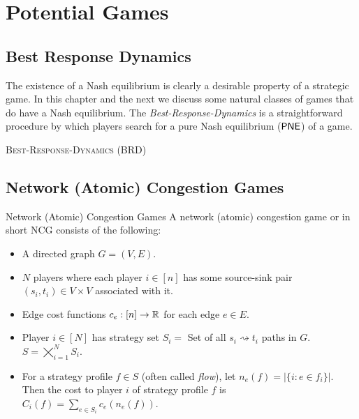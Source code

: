 \chapter{Potential Games}
\section{Best Response Dynamics}
The existence of a Nash equilibrium is clearly a desirable property of a strategic game. In this chapter and the next we discuss some natural classes of games that do have a Nash equilibrium. The \textit{Best-Response-Dynamics} is a straightforward procedure by which players search for a pure
Nash equilibrium ($\operatorname{\mathsf{PNE}}$) of a game. 

\begin{algorithm}\DontPrintSemicolon
{}
	
\caption{\textsc{Best-Response-Dynamics} (\textsf{BRD})}
\end{algorithm}



\section{Network (Atomic) Congestion Games}
\begin{definition}{Network (Atomic) Congestion Games}{}
	A network (atomic) congestion game or in short NCG consists of the following:
	\begin{itemize}[itemsep=-1mm]
		\item A directed graph $G=(V,E)$.
		\item $N$ players where  each player $i\in[n]$ has some source-sink pair $(s_i,t_i)\in V\times V$ associated with it.
		\item Edge cost functions $c_e:[n]\to \mathbb{R}$ for each edge $e\in E$.
		\item Player $i\in[N]$ has strategy set $S_i=$ Set of all $s_i\rightsquigarrow t_i$ paths in $G$. $S=\bigtimes\limits_{i=1}^N S_i$.
		\item For a strategy profile $f\in S$ (often called \textit{flow}), let $n_e(f)=|\{i\colon e\in f_i\}|$. Then the cost to player $i$ of strategy profile $f$ is $C_i(f)=\sum\limits_{e\in S_i}c_e(n_e(f))$. 
	\end{itemize}
\end{definition}

